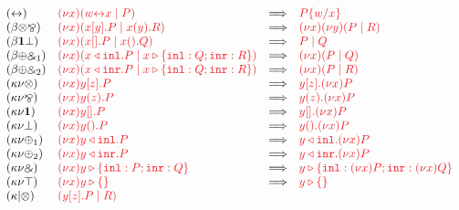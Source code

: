 \documentclass[submission,copyright,creativecommons]{eptcs}
\begin{document}
\begin{figure}[htb]
  \begin{gather*}
    \begin{array}{llcll}
      \hccpRedAxCut1
      & \tm{\cpCut{x}{\cpLink{w}{x}}{P}}
      & \Longrightarrow
      & \tm{\cpSub{w}{x}{P}}
      \\
      \hccpRedBetaTensParr
      & \tm{\cpCut{x}{\piBoundSend{x}{y}{P}}{\piRecv{x}{y}{R}}}
      & \Longrightarrow
      & \tm{\piNew{x}{\piNew{y}{(\piPar{P}{R})}}}
      \\
      \hccpRedBetaOneBot
      & \tm{\cpCut{x}{\piBoundSend{x}{}{P}}{\piRecv{x}{}{Q}}}
      & \Longrightarrow
      & \tm{\piPar{P}{Q}}
      \\
      \hccpRedBetaPlusWith1
      & \tm{\cpCut{x}{\cpInl{x}{P}}{\cpCase{x}{Q}{R}}}
      & \Longrightarrow
      & \tm{\cpCut{x}{P}{Q}}
      \\
      \hccpRedBetaPlusWith2
      & \tm{\cpCut{x}{\cpInr{x}{P}}{\cpCase{x}{Q}{R}}}
      & \Longrightarrow
      & \tm{\cpCut{x}{P}{R}}
      \\
      \hccpRedKappaNuTens
      & \tm{\piNew{x}{\piBoundSend{y}{z}{P}}}
      & \Longrightarrow
      & \tm{\piBoundSend{y}{z}{\piNew{x}{P}}}
      \\
      \hccpRedKappaNuParr
      & \tm{\piNew{x}{\piRecv{y}{z}{P}}}
      & \Longrightarrow
      & \tm{\piRecv{y}{z}{\piNew{x}{P}}}
      \\
      \hccpRedKappaNuOne
      & \tm{\piNew{x}{\piBoundSend{y}{}{P}}}
      & \Longrightarrow
      & \tm{\piBoundSend{y}{}{\piNew{x}{P}}}
      \\
      \hccpRedKappaNuBot
      & \tm{\piNew{x}{\piRecv{y}{}{P}}}
      & \Longrightarrow
      & \tm{\piRecv{y}{}{\piNew{x}{P}}}
      \\
      \hccpRedKappaNuPlus1
      & \tm{\piNew{x}{\cpInl{y}{P}}}
      & \Longrightarrow
      & \tm{\cpInl{y}{\piNew{x}{P}}}
      \\
      \hccpRedKappaNuPlus2
      & \tm{\piNew{x}{\cpInr{y}{P}}}
      & \Longrightarrow
      & \tm{\cpInr{y}{\piNew{x}{P}}}
      \\
      \hccpRedKappaNuWith
      & \tm{\piNew{x}{\cpCase{y}{P}{Q}}}
      & \Longrightarrow
      & \tm{\cpCase{y}{\piNew{x}{P}}{\piNew{x}{Q}}}
      \\
      \hccpRedKappaNuTop
      & \tm{\piNew{x}{\cpAbsurd{y}}}
      & \Longrightarrow
      & \tm{\cpAbsurd{y}}
      \\
      \hccpRedKappaMixTens
      & \tm{(\piPar{\piBoundSend{y}{z}{P}}{R})}

\end{array}
\end{gather*}
\end{figure}
\end{document}
